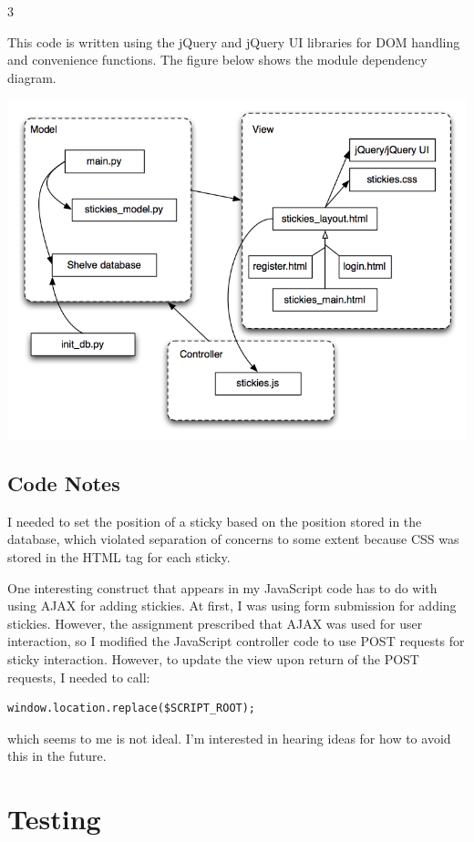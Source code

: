 3\documentclass[11pt,letterpaper]{article}
\begin{document}
This code is written using the jQuery and jQuery UI libraries for DOM handling and convenience functions. The figure below shows the module dependency diagram.

\begin{center}
\includegraphics[width=400pt]{dot/moddep.png}
\label{fig:ob2} 
\end{center}
\subsection{Code Notes}
I needed to set the position of a sticky based on the position stored in the database, which violated separation of concerns to some extent because CSS was stored in the HTML tag for each sticky.

One interesting construct that appears in my JavaScript code has to do with using AJAX for adding stickies. At first, I was using form submission for adding stickies. However, the assignment prescribed that AJAX was used for user interaction, so I modified the JavaScript controller code to use POST requests for sticky interaction. However, to update the view upon return of the POST requests, I needed to call:
\begin{verbatim}
window.location.replace($SCRIPT_ROOT);
\end{verbatim}
which seems to me is not ideal. I'm interested in hearing ideas for how to avoid this in the future.

\section{Testing}
\end{document}
